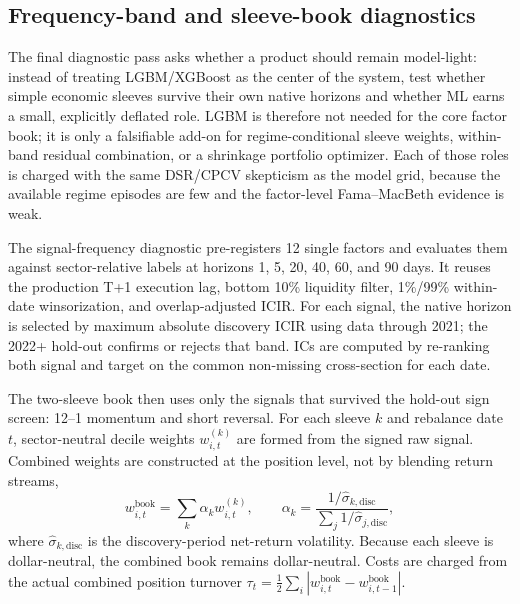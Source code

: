 \documentclass[9pt]{extarticle}
\begin{document}
\subsection{Frequency-band and sleeve-book diagnostics}
The final diagnostic pass asks whether a product should remain model-light:
instead of treating LGBM/XGBoost as the center of the system, test whether
simple economic sleeves survive their own native horizons and whether ML earns a
small, explicitly deflated role. LGBM is therefore not needed for the core
factor book; it is only a falsifiable add-on for regime-conditional sleeve
weights, within-band residual combination, or a shrinkage portfolio optimizer.
Each of those roles is charged with the same DSR/CPCV skepticism as the model
grid, because the available regime episodes are few and the factor-level
Fama--MacBeth evidence is weak.

The signal-frequency diagnostic pre-registers 12 single factors and evaluates
them against sector-relative labels at horizons 1, 5, 20, 40, 60, and 90 days.
It reuses the production T+1 execution lag, bottom 10\% liquidity filter,
1\%/99\% within-date winsorization, and overlap-adjusted ICIR. For each signal,
the native horizon is selected by maximum absolute discovery ICIR using data
through 2021; the 2022+ hold-out confirms or rejects that band. ICs are computed
by re-ranking both signal and target on the common non-missing cross-section for
each date.

The two-sleeve book then uses only the signals that survived the hold-out sign
screen: 12--1 momentum and short reversal. For each sleeve $k$ and rebalance date
$t$, sector-neutral decile weights $w^{(k)}_{i,t}$ are formed from the signed
raw signal. Combined weights are constructed at the position level, not by
blending return streams,
\[
  w^{\text{book}}_{i,t}=\sum_k \alpha_k w^{(k)}_{i,t},\qquad
  \alpha_k=\frac{1/\widehat{\sigma}_{k,\text{disc}}}
                 {\sum_j 1/\widehat{\sigma}_{j,\text{disc}}},
\]
where $\widehat{\sigma}_{k,\text{disc}}$ is the discovery-period net-return
volatility. Because each sleeve is dollar-neutral, the combined book remains
dollar-neutral. Costs are charged from the actual combined position turnover
$\tau_t=\frac12\sum_i|w^{\text{book}}_{i,t}-w^{\text{book}}_{i,t-1}|$.
\end{document}
